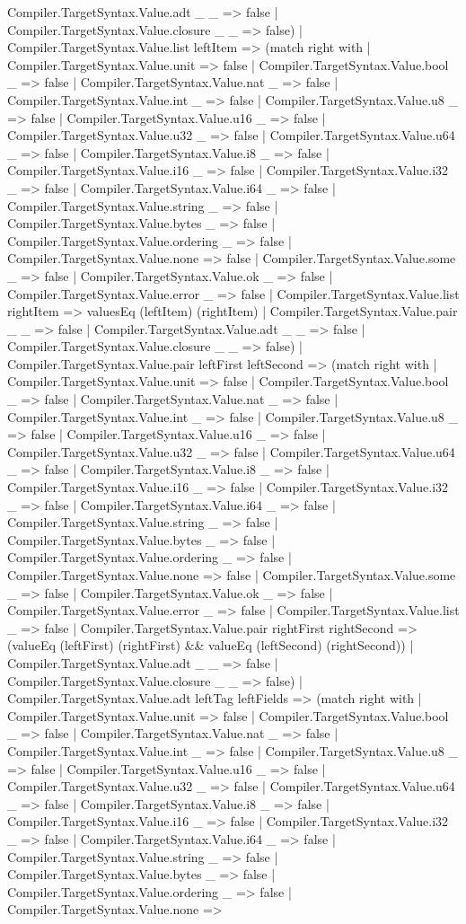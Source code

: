 \documentclass[11pt]{article}
\begin{document}
Compiler.TargetSyntax.Value.adt \_ \_ => false | Compiler.TargetSyntax.Value.closure \_ \_ => false) | Compiler.TargetSyntax.Value.list leftItem => (match right with | Compiler.TargetSyntax.Value.unit => false | Compiler.TargetSyntax.Value.bool \_ => false | Compiler.TargetSyntax.Value.nat \_ => false | Compiler.TargetSyntax.Value.int \_ => false | Compiler.TargetSyntax.Value.u8 \_ => false | Compiler.TargetSyntax.Value.u16 \_ => false | Compiler.TargetSyntax.Value.u32 \_ => false | Compiler.TargetSyntax.Value.u64 \_ => false | Compiler.TargetSyntax.Value.i8 \_ => false | Compiler.TargetSyntax.Value.i16 \_ => false | Compiler.TargetSyntax.Value.i32 \_ => false | Compiler.TargetSyntax.Value.i64 \_ => false | Compiler.TargetSyntax.Value.string \_ => false | Compiler.TargetSyntax.Value.bytes \_ => false | Compiler.TargetSyntax.Value.ordering \_ => false | Compiler.TargetSyntax.Value.none => false | Compiler.TargetSyntax.Value.some \_ => false | Compiler.TargetSyntax.Value.ok \_ => false | Compiler.TargetSyntax.Value.error \_ => false | Compiler.TargetSyntax.Value.list rightItem => valuesEq (leftItem) (rightItem) | Compiler.TargetSyntax.Value.pair \_ \_ => false | Compiler.TargetSyntax.Value.adt \_ \_ => false | Compiler.TargetSyntax.Value.closure \_ \_ => false) | Compiler.TargetSyntax.Value.pair leftFirst leftSecond => (match right with | Compiler.TargetSyntax.Value.unit => false | Compiler.TargetSyntax.Value.bool \_ => false | Compiler.TargetSyntax.Value.nat \_ => false | Compiler.TargetSyntax.Value.int \_ => false | Compiler.TargetSyntax.Value.u8 \_ => false | Compiler.TargetSyntax.Value.u16 \_ => false | Compiler.TargetSyntax.Value.u32 \_ => false | Compiler.TargetSyntax.Value.u64 \_ => false | Compiler.TargetSyntax.Value.i8 \_ => false | Compiler.TargetSyntax.Value.i16 \_ => false | Compiler.TargetSyntax.Value.i32 \_ => false | Compiler.TargetSyntax.Value.i64 \_ => false | Compiler.TargetSyntax.Value.string \_ => false | Compiler.TargetSyntax.Value.bytes \_ => false | Compiler.TargetSyntax.Value.ordering \_ => false | Compiler.TargetSyntax.Value.none => false | Compiler.TargetSyntax.Value.some \_ => false | Compiler.TargetSyntax.Value.ok \_ => false | Compiler.TargetSyntax.Value.error \_ => false | Compiler.TargetSyntax.Value.list \_ => false | Compiler.TargetSyntax.Value.pair rightFirst rightSecond => (valueEq (leftFirst) (rightFirst) \&\& valueEq (leftSecond) (rightSecond)) | Compiler.TargetSyntax.Value.adt \_ \_ => false | Compiler.TargetSyntax.Value.closure \_ \_ => false) | Compiler.TargetSyntax.Value.adt leftTag leftFields => (match right with | Compiler.TargetSyntax.Value.unit => false | Compiler.TargetSyntax.Value.bool \_ => false | Compiler.TargetSyntax.Value.nat \_ => false | Compiler.TargetSyntax.Value.int \_ => false | Compiler.TargetSyntax.Value.u8 \_ => false | Compiler.TargetSyntax.Value.u16 \_ => false | Compiler.TargetSyntax.Value.u32 \_ => false | Compiler.TargetSyntax.Value.u64 \_ => false | Compiler.TargetSyntax.Value.i8 \_ => false | Compiler.TargetSyntax.Value.i16 \_ => false | Compiler.TargetSyntax.Value.i32 \_ => false | Compiler.TargetSyntax.Value.i64 \_ => false | Compiler.TargetSyntax.Value.string \_ => false | Compiler.TargetSyntax.Value.bytes \_ => false | Compiler.TargetSyntax.Value.ordering \_ => false | Compiler.TargetSyntax.Value.none => 
\end{document}
